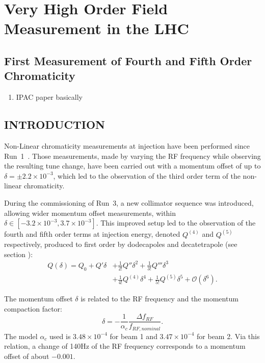 \chapter{Very High Order Field Measurement in the LHC}
\thumbforchapter{}
\chaptertoc{}
\newpage

\section{First Measurement of Fourth and Fifth Order Chromaticity}

\begin{enumerate}
\color{red}
    \item IPAC paper basically
\end{enumerate}


\section{INTRODUCTION}

Non-Linear chromaticity measurements at injection have been performed since Run~1~\cite{maclean:ipac11-wepc078,maclean:ipac16-thpmr039,maclean_commissioning_2016,maclean_measurement_2014-1}. Those measurements, made by varying the RF frequency while observing the resulting tune change, have been
carried out with a momentum offset of up to $\delta = \pm 2.2 \times 10^{-3}$, which led to the
observation of the third order term of the non-linear chromaticity.

During the commissioning of Run~3, a new collimator sequence was introduced, allowing wider
momentum offset measurements, within $\delta \in [-3.2\times 10^{-3},3.7 \times 10^{-3}]$.
This improved setup led to the observation of the fourth and fifth order
terms at injection energy, denoted $Q^{(4)}$ and $Q^{(5)}$ respectively, produced to first order by dodecapoles and decatetrapole (see section ):
\begin{equation}
\begin{aligned}
Q(\delta) = Q_0 + Q'\delta &+ \frac{1}{2!}Q''\delta^2 + \frac{1}{3!}Q'''\delta^3 \\
                           &+ \frac{1}{4!}Q^{(4)}\delta^4  + \frac{1}{5!}Q^{(5)}\delta^5 + \mathcal{O}(\delta^6).
\end{aligned}
\end{equation}

The momentum offset $\delta$ is  related to the RF frequency and the momentum compaction factor:
$$
\delta = -\frac{1}{\alpha_c} \frac{\Delta f_{RF}}{f_{RF,nominal}}.
$$
The model $\alpha_c$ used is $3.48 \times 10^{-4}$ for beam 1 and $3.47 \times 10^{-4}$ for beam 2.
Via this relation, a change of 140Hz of the RF frequency corresponds to a momentum offset of about $-0.001$.

